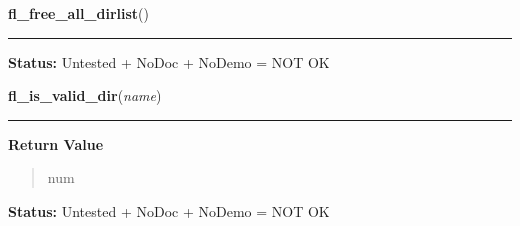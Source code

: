    \vspace{0.5ex}

\hspace{.8\funcindent}\begin{boxedminipage}{\funcwidth}

    \raggedright \textbf{fl\_free\_all\_dirlist}()

    \vspace{-1.5ex}

    \rule{\textwidth}{0.5\fboxrule}
\setlength{\parskip}{2ex}
\setlength{\parskip}{1ex}
\textbf{Status:} Untested + NoDoc + NoDemo = NOT OK



    \end{boxedminipage}

    \label{xformslib:library:fl_is_valid_dir}

    \vspace{0.5ex}

\hspace{.8\funcindent}\begin{boxedminipage}{\funcwidth}

    \raggedright \textbf{fl\_is\_valid\_dir}(\textit{name})

    \vspace{-1.5ex}

    \rule{\textwidth}{0.5\fboxrule}
\setlength{\parskip}{2ex}
\setlength{\parskip}{1ex}
      \textbf{Return Value}
    \vspace{-1ex}

      \begin{quote}
      num

      \end{quote}

\textbf{Status:} Untested + NoDoc + NoDemo = NOT OK



    \end{boxedminipage}

    \label{xformslib:library:fl_fmtime}

    \vspace{0.5ex}

